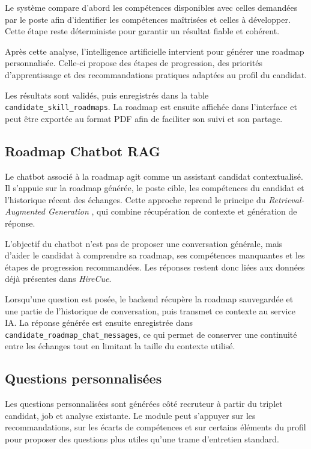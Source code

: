 Le système compare d'abord les compétences disponibles avec celles demandées par le poste afin d'identifier les compétences maîtrisées et celles à développer. Cette étape reste déterministe pour garantir un résultat fiable et cohérent.

Après cette analyse, l'intelligence artificielle intervient pour générer une roadmap personnalisée. Celle-ci propose des étapes de progression, des priorités d'apprentissage et des recommandations pratiques adaptées au profil du candidat.

Les résultats sont validés, puis enregistrés dans la table \texttt{candidate\_skill\_roadmaps}. La roadmap est ensuite affichée dans l'interface et peut être exportée au format PDF afin de faciliter son suivi et son partage.

\subsection{Roadmap Chatbot RAG}

Le chatbot associé à la roadmap agit comme un assistant candidat contextualisé. Il s'appuie sur la roadmap générée, le poste cible, les compétences du candidat et l'historique récent des échanges. Cette approche reprend le principe du \textit{Retrieval-Augmented Generation} \cite{lewis_rag}, qui combine récupération de contexte et génération de réponse.

L'objectif du chatbot n'est pas de proposer une conversation générale, mais d'aider le candidat à comprendre sa roadmap, ses compétences manquantes et les étapes de progression recommandées. Les réponses restent donc liées aux données déjà présentes dans \textit{HireCue}.

Lorsqu'une question est posée, le backend récupère la roadmap sauvegardée et une partie de l'historique de conversation, puis transmet ce contexte au service IA. La réponse générée est ensuite enregistrée dans \texttt{candidate\_roadmap\_chat\_messages}, ce qui permet de conserver une continuité entre les échanges tout en limitant la taille du contexte utilisé.

\subsection{Questions personnalisées}

Les questions personnalisées sont générées côté recruteur à partir du triplet candidat, job et analyse existante. Le module peut s'appuyer sur les recommandations, sur les écarts de compétences et sur certains éléments du profil pour proposer des questions plus utiles qu'une trame d'entretien standard.


